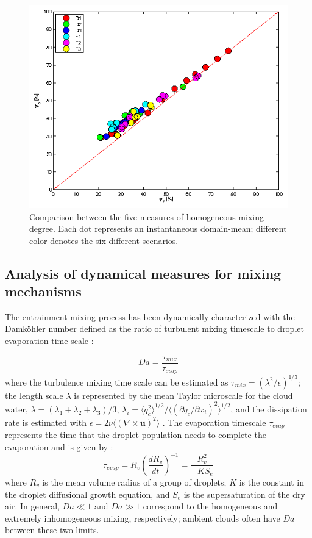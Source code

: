 \documentclass[draft,jgrga]{AGUTeX}
\begin{document}
\begin{article}
\begin{figure}[!htbp]
\includegraphics[width=0.45\linewidth]{Figures/phi2_phi5}
\caption{Comparison between the five measures of homogeneous mixing degree. Each dot represents an instantaneous domain-mean; different color denotes the six different scenarios.\label{phi_compare}}
\end{figure}

\subsection{Analysis of dynamical measures for mixing mechanisms}
The entrainment-mixing process has been dynamically characterized with the Damk{\"o}hler number defined as the ratio of 
turbulent mixing timescale to droplet evaporation time scale
\cite{Krueger1997Modeling, Grabowski1993Cumulus}:

\begin{equation}
Da=\frac{\tau_{mix}}{\tau_{evap}}\label{eq:DaNumber}
\end{equation}
where the turbulence mixing time scale can be estimated as $\tau_{mix} = (\lambda^2/\epsilon)^{1/3}$; the length scale $\lambda$ is represented by the mean Taylor microscale for the cloud water, $\lambda = 
(\lambda_1+\lambda_2+\lambda_3)/3$, $\lambda_i = \langle q_c^2\rangle^{1/2}/\langle(\partial q_c/\partial x_i)^2\rangle^{1/2}$, and the dissipation rate is estimated with $\epsilon = 2\nu\langle(\nabla\times \mathbf{u})^2\rangle$ \citep{And09}. The evaporation timescale $\tau_{evap}$ represents the time that the 
droplet population needs to complete the evaporation and is given by 
\cite{And09, Burnet2007Observational}:
\begin{equation}
\tau_{evap} = R_v(\frac{dR_v}{dt})^{-1} = \frac{R_v^2}{-KS_e}
\end{equation}
where $R_v$ is the mean volume radius of a group of droplets; $K$ is the constant in the 
droplet diffusional growth equation, and $S_e$ is the supersaturation of the dry air. In general, $Da \ll 1$ and $Da \gg 1$ correspond to the homogeneous and extremely inhomogeneous mixing, respectively; ambient clouds often have $Da$ between these two limits.


\end{article}
\end{document}
